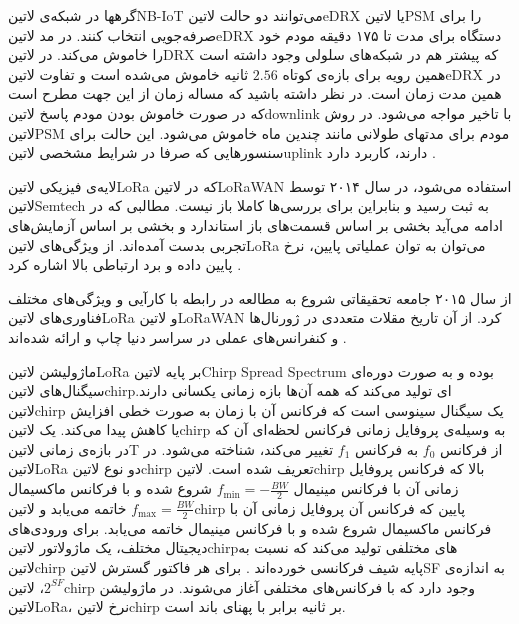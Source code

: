 گرهها در شبکه‌ی ‌لاتین{NB-IoT} می‌توانند دو حالت ‌لاتین{eDRX} یا ‌لاتین{PSM} را برای صرفه‌جویی انتخاب کنند.
در مد ‌لاتین{eDRX} دستگاه برای مدت تا ۱۷۵ دقیقه مودم خود را خاموش می‌کند.
در ‌لاتین{DRX} که پیشتر هم در شبکه‌های سلولی وجود داشته است همین رویه برای بازه‌ی کوتاه $2.56$ ثانیه خاموش می‌شده است
و تفاوت ‌لاتین{eDRX} در همین مدت زمان است.
در نظر داشته باشید که مساله زمان از این جهت مطرح است که در صورت خاموش بودن مودم پاسخ ‌لاتین{downlink} با تاخیر مواجه می‌شود.
در روش ‌لاتین{PSM} مودم برای مدتهای طولانی مانند چندین ماه خاموش می‌شود.
این حالت برای سنسورهایی که صرفا در شرایط مشخصی ‌لاتین{uplink} دارند، کاربرد دارد
.


لایه‌ی فیزیکی ‌لاتین{LoRa} که در ‌لاتین{LoRaWAN} استفاده می‌شود، در سال ۲۰۱۴ توسط ‌لاتین{Semtech} به ثبت رسید
و بنابراین برای بررسی‌ها کاملا باز نیست. مطالبی که در ادامه می‌آید بخشی بر اساس قسمت‌های باز استاندارد و بخشی بر اساس آزمایش‌های
تجربی بدست آمده‌اند.
از ویژگی‌های ‌لاتین{LoRa} می‌توان به توان عملیاتی پایین، نرخ پایین داده و برد ارتباطی بالا اشاره کرد
.

از سال ۲۰۱۵ جامعه تحقیقاتی شروع به مطالعه در رابطه با کارآیی و ویژگی‌های مختلف فناوری‌های ‌لاتین{LoRa} و ‌لاتین{LoRaWAN} کرد.
از آن تاریخ مقلات متعددی در ژورنال‌ها و کنفرانس‌های عملی در سراسر دنیا چاپ و ارائه شده‌اند
.

ماژولیشن ‌لاتین{LoRa} بر پایه ‌لاتین{Chirp Spread Spectrum} بوده و به صورت دوره‌ای سیگنال‌های ‌لاتین{chirp}ای تولید می‌کند که همه آن‌ها بازه زمانی یکسانی دارند.
‌لاتین{chirp} یک سیگنال سینوسی است که فرکانس آن با زمان به صورت خطی افزایش یا کاهش پیدا می‌کند.
یک ‌لاتین{chirp} به وسیله‌ی پروفایل زمانی فرکانس لحظه‌ای آن که در بازه‌ی زمانی ‌لاتین{T} از فرکانس $f_0$ به فرکانس $f_1$
تغییر می‌کند، شناخته می‌شود.
در ‌لاتین{LoRa} دو نوع ‌لاتین{chirp} تعریف شده است. ‌لاتین{chirp} بالا که فرکانس پروفایل زمانی آن با فرکانس مینیمال
\(f_{\min} = -\frac{BW}{2}\)
شروع شده و با فرکانس ماکسیمال
\(f_{\max} = \frac{BW}{2}\)
خاتمه می‌یابد و ‌لاتین{chirp} پایین که فرکانس آن پروفایل زمانی آن با فرکانس ماکسیمال
شروع شده و با فرکانس مینیمال خاتمه می‌یابد.
برای ورودی‌های دیجیتال مختلف، یک ماژولاتور ‌لاتین{chirp}های مختلفی تولید می‌کند که نسبت به ‌لاتین{chirp} پایه شیف فرکانسی خورده‌اند
 .
برای هر فاکتور گسترش ‌لاتین{SF} به اندازه‌ی $2^{SF}$، ‌لاتین{chirp} وجود دارد که با فرکانس‌های مختلفی آغاز می‌شوند.
در ماژولیشن ‌لاتین{LoRa}، نرخ ‌لاتین{chirp} بر ثانیه برابر با پهنای باند است.

